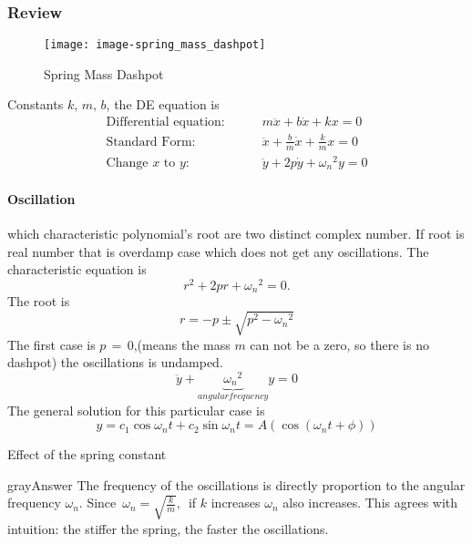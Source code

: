 \subsubsection{Review}
\begin{figure}[ht!]
  \centering
  \texttt{[image: image-spring\_mass\_dashpot]}
  \caption{Spring Mass Dashpot}
\end{figure}
Constants $k, \, m, \, b$, the DE equation is
\begin{eqnarray*}
  \text{Differential equation: } & \quad & m \ddot{x} + b \dot{x} + kx = 0\\
  \text{Standard Form: } & \quad & \ddot{x} + \frac{b}{m} \dot{x} + \frac{k}{m} x = 0\\
  \text{Change $x$ to $y$: } & \quad & \ddot{y} + 2p \dot{y} + {\omega _n}^2 y = 0
\end{eqnarray*}

\paragraph{Oscillation} which characteristic polynomial's root are two distinct complex number.
If root is real number that is overdamp case which does not get any oscillations.
The characteristic equation is
\begin{equation*}
  r^2 + 2pr + {\omega _n}^2 = 0. 
\end{equation*}
The root is
\begin{equation*}
  r = -p \pm \sqrt{p^2 - {\omega _n}^2}
\end{equation*}
The first case is $p \, = \, 0$,(means the mass $m$ can not be a zero, so there is no
dashpot) the oscillations is undamped.
\begin{equation*}
  \ddot{y} + \underbrace{{\omega _n}^2}_{angular frequency} y = 0 
\end{equation*}
The general solution for this particular case is
\begin{equation*}
  y = c_1 \cos \omega_n t + c_2 \sin \omega_n t = A \left( \cos(\omega_n t + \phi) \right)
\end{equation*}

\begin{exercise}
  Effect of the spring constant
\end{exercise}

\begin{mybox}{gray}{Answer}
  The frequency of the oscillations is directly proportion to the angular frequency
  $\omega _n$. Since $\displaystyle \, \omega _ n=\sqrt {\frac{k}{m}},\,$ if $k$ increases
  $\omega _n$ also increases.
  This agrees with intuition: the stiffer the spring, the faster the oscillations.  
\end{mybox}
\clearpage

